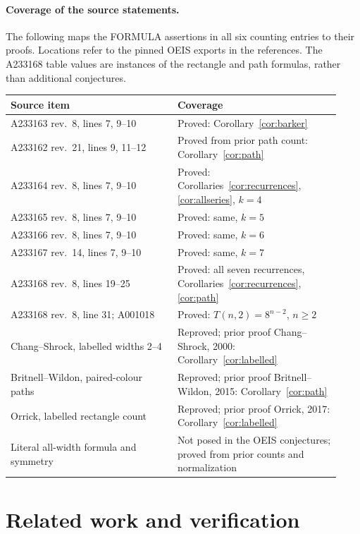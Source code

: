 \documentclass[11pt]{article}
\begin{document}
\paragraph{Coverage of the source statements.}
The following maps the FORMULA assertions in all six counting entries
to their proofs. Locations refer to the pinned OEIS exports in the
references. The A233168 table values are instances of the rectangle
and path formulas, rather than additional conjectures.
\begin{center}
\small
\begin{tabular}{@{}>{\raggedright\arraybackslash}p{0.47\linewidth}>{\raggedright\arraybackslash}p{0.46\linewidth}@{}}
\toprule
Source item & Coverage\\
\midrule
A233163 rev.\ 8, lines 7, 9--10 & Proved: Corollary~\ref{cor:barker}\\
A233162 rev.\ 21, lines 9, 11--12 & Proved from prior path count: Corollary~\ref{cor:path}\\
A233164 rev.\ 8, lines 7, 9--10 & Proved: Corollaries~\ref{cor:recurrences}, \ref{cor:allseries}, $k=4$\\
A233165 rev.\ 8, lines 7, 9--10 & Proved: same, $k=5$\\
A233166 rev.\ 8, lines 7, 9--10 & Proved: same, $k=6$\\
A233167 rev.\ 14, lines 7, 9--10 & Proved: same, $k=7$\\
A233168 rev.\ 8, lines 19--25 & Proved: all seven recurrences, Corollaries~\ref{cor:recurrences}, \ref{cor:path}\\
A233168 rev.\ 8, line 31; A001018 & Proved: $T(n,2)=8^{n-2}$, $n\geq2$\\
Chang--Shrock, labelled widths 2--4 & Reproved; prior proof Chang--Shrock, 2000: Corollary~\ref{cor:labelled}\\
Britnell--Wildon, paired-colour paths & Reproved; prior proof Britnell--Wildon, 2015: Corollary~\ref{cor:path}\\
Orrick, labelled rectangle count & Reproved; prior proof Orrick, 2017: Corollary~\ref{cor:labelled}\\
Literal all-width formula and symmetry & Not posed in the OEIS conjectures; proved from prior counts and normalization\\
\bottomrule
\end{tabular}
\end{center}

\section{Related work and verification}
\end{document}
